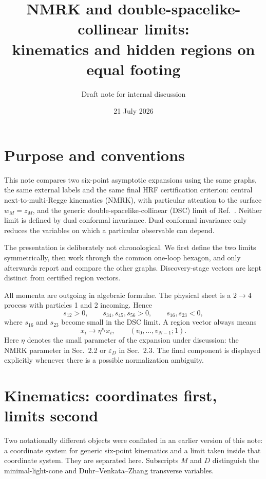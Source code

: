 \documentclass[11pt]{article}
\title{NMRK and double-spacelike-collinear limits:\\
kinematics and hidden regions on equal footing}
\author{Draft note for internal discussion}
\date{21 July 2026}
\begin{document}
\maketitle

\section{Purpose and conventions}

This note compares two six-point asymptotic expansions using the same graphs,
the same external labels and the same final HRF certification criterion:
central next-to-multi-Regge kinematics (NMRK), with particular attention to
the surface \(w_M=z_M\), and the generic double-spacelike-collinear (DSC) limit of
Ref.~\cite{Duhr:2025lyg}.  Neither limit is defined by dual conformal
invariance.  Dual conformal invariance only reduces the variables on which a
particular observable can depend.

The presentation is deliberately not chronological.  We first define the two
limits symmetrically, then work through the common one-loop hexagon, and only
afterwards report and compare the other graphs.  Discovery-stage vectors are
kept distinct from certified region vectors.

All momenta are outgoing in algebraic formulae.  The physical sheet is a
\(2\to4\) process with particles 1 and 2 incoming.  Hence
\begin{equation}
 s_{12}>0,\qquad s_{34},s_{45},s_{56}>0,\qquad
 s_{16},s_{23}<0,
 \label{eq:physical-signs}
\end{equation}
where \(s_{16}\) and \(s_{23}\) become small in the DSC limit.  A region vector
always means
\begin{equation}
 x_i\longrightarrow\eta^{v_i}x_i,\qquad (v_0,\ldots,v_{N-1};1).
 \label{eq:vector-convention}
\end{equation}
Here \(\eta\) denotes the small parameter of the expansion under discussion:
the NMRK parameter in Sec.~2.2 or \(\varepsilon_D\) in Sec.~2.3.
The final component is displayed explicitly whenever there is a possible
normalization ambiguity.

\section{Kinematics: coordinates first, limits second}

Two notationally different objects were conflated in an earlier version of
this note: a coordinate system for generic six-point kinematics and a limit
taken inside that coordinate system.  They are separated here.  Subscripts
\(M\) and \(D\) distinguish the minimal-light-cone and Duhr--Venkata--Zhang
transverse variables.
\end{document}
